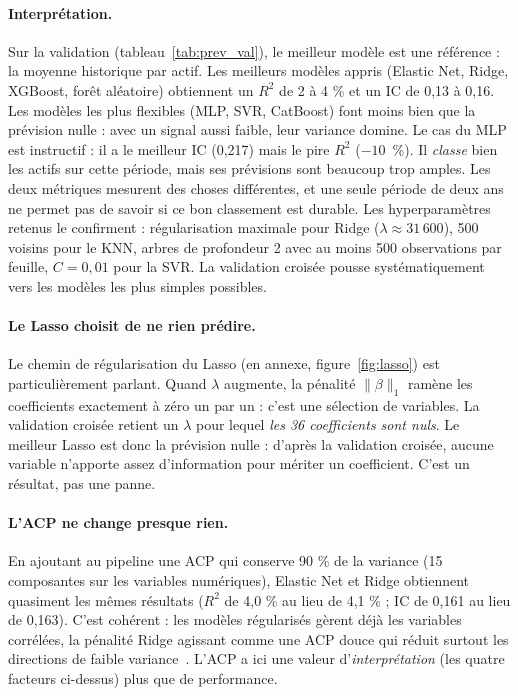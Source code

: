 \paragraph{Interprétation.} Sur la validation (tableau~\ref{tab:prev_val}), le meilleur \og modèle \fg{} est une référence : la moyenne historique par actif. Les meilleurs modèles appris (Elastic Net, Ridge, XGBoost, forêt aléatoire) obtiennent un $R^2$ de 2 à 4 \% et un IC de 0,13 à 0,16. Les modèles les plus flexibles (MLP, SVR, CatBoost) font moins bien que la prévision nulle : avec un signal aussi faible, leur variance domine. Le cas du MLP est instructif : il a le meilleur IC (0,217) mais le pire $R^2$ ($-10$~\%). Il \emph{classe} bien les actifs sur cette période, mais ses prévisions sont beaucoup trop amples. Les deux métriques mesurent des choses différentes, et une seule période de deux ans ne permet pas de savoir si ce bon classement est durable. Les hyperparamètres retenus le confirment : régularisation maximale pour Ridge ($\lambda \approx 31\,600$), 500 voisins pour le KNN, arbres de profondeur 2 avec au moins 500 observations par feuille, $C = 0{,}01$ pour la SVR. La validation croisée pousse systématiquement vers les modèles les plus simples possibles.

\paragraph{Le Lasso choisit de ne rien prédire.} Le chemin de régularisation du Lasso (en annexe, figure~\ref{fig:lasso}) est particulièrement parlant. Quand $\lambda$ augmente, la pénalité $\lVert\beta\rVert_1$ ramène les coefficients exactement à zéro un par un : c'est une sélection de variables. La validation croisée retient un $\lambda$ pour lequel \emph{les 36 coefficients sont nuls}. Le meilleur Lasso est donc la prévision nulle : d'après la validation croisée, aucune variable n'apporte assez d'information pour mériter un coefficient. C'est un résultat, pas une panne.

\paragraph{L'ACP ne change presque rien.} En ajoutant au pipeline une ACP qui conserve 90 \% de la variance (15 composantes sur les variables numériques), Elastic Net et Ridge obtiennent quasiment les mêmes résultats ($R^2$ de 4,0 \% au lieu de 4,1 \% ; IC de 0,161 au lieu de 0,163). C'est cohérent : les modèles régularisés gèrent déjà les variables corrélées, la pénalité Ridge agissant comme une ACP \og douce \fg{} qui réduit surtout les directions de faible variance~\cite{hastie2009}. L'ACP a ici une valeur d'\emph{interprétation} (les quatre facteurs ci-dessus) plus que de performance.

